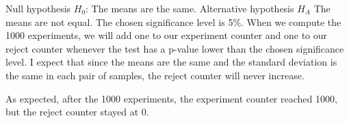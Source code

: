 \documentclass[a4paper]{article}
\begin{document}
Null hypothesis $H_0$: The means are the same.\newline
Alternative hypothesis $H_A$ The means are not equal.\newline
The chosen significance level is 5\%. \newline\newline
When we compute the 1000 experiments, we will add one to our experiment counter and one to our reject counter whenever the test has a p-value lower than the chosen significance level. I expect that since the means are the same and the standard deviation is the same in each pair of samples, the reject counter will never increase.
As expected, after the 1000 experiments, the experiment counter reached 1000, but the reject counter stayed at 0.
\end{document}
